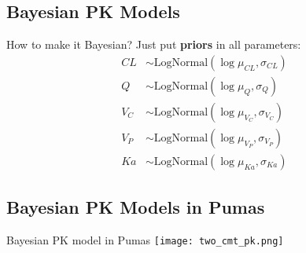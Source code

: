 \subsection{Bayesian PK Models}
\begin{frame}{How to make it Bayesian?}
    Just put \textbf{priors} in all parameters:
    $$
        \begin{aligned}
            CL  & \sim \text{LogNormal}(\log{\mu_{CL}}, \sigma_{CL})   \\
            Q   & \sim \text{LogNormal}(\log{\mu_{Q}}, \sigma_{Q})     \\
            V_C & \sim \text{LogNormal}(\log{\mu_{V_C}}, \sigma_{V_C}) \\
            V_P & \sim \text{LogNormal}(\log{\mu_{V_P}}, \sigma_{V_P}) \\
            Ka  & \sim \text{LogNormal}(\log{\mu_{Ka}}, \sigma_{Ka})
        \end{aligned}
    $$
\end{frame}

\subsection{Bayesian PK Models in Pumas}
\begin{frame}{Bayesian PK model in Pumas}
    \centering
    \texttt{[image: two\_cmt\_pk.png]}
\end{frame}
